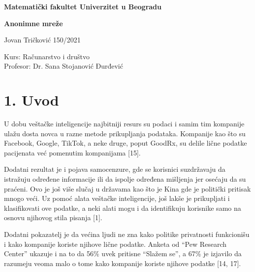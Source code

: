 \documentclass[
]{article}
\author{}
\date{}
\begin{document}
\begin{titlepage}

    \thispagestyle{plain} 

    \centering
    
    \vspace*{1cm}
    {\Huge \textbf{Matematički fakultet
                Univerzitet u Beogradu}\par}

    \vfill 

    {\Huge \textbf{Anonimne mreže}\par}
    \vspace{0.5cm} 
    {\Large Jovan Tričković 150/2021\par}

    \vfill 

    \begin{flushright}
        {\large
        Kurs: Računarstvo i društvo\ \\
        Profesor: Dr. Sana Stojanović Đurđević\par}
    \end{flushright}

    \vspace*{1cm}
\end{titlepage}

\tableofcontents

\section{1. Uvod}
\label{sec:t1}

U dobu veštačke inteligencije najbitniji resurs su podaci i samim tim
kompanije ulažu dosta novca u razne metode prikupljanja podataka.
Kompanije kao što su Facebook, Google, TikTok, a neke druge, poput
GoodRx, su delile lične podatke pacijenata već pomenutim kompanijama
[15].

Dodatni rezultat je i pojava samocenzure, gde se korisnici
suzdržavaju da istražuju određene informacije ili da ispolje određena
mišljenja jer osećaju da su praćeni. Ovo je još više slučaj u državama
kao što je Kina gde je politički pritisak mnogo veći. Uz pomoć alata
veštačke inteligencije, još lakše je prikupljati i klasifikovati ove
podatke, a neki alati mogu i da identifikuju korisnike samo na osnovu
njihovog stila pisanja [1].

Dodatni pokazatelj je da većina ljudi ne zna kako politike privatnosti
funkcionišu i kako kompanije koriste njihove lične podatke. Anketa od
``Pew Research Center'' ukazuje i na to da 56\% uvek pritisne ``Slažem
se'', a 67\% je izjavilo da razumeju veoma malo o tome kako kompanije
koriste njihove podatke [14, 17].
\end{document}
